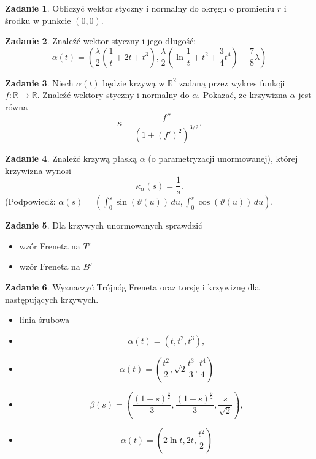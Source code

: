 \documentclass[a4paper,11pt]{article}
\theoremstyle{definition}\newtheorem{exercise}{Zadanie}
\theoremstyle{definition}\newtheorem{remark}{Uwaga}
\begin{document}
\begin{exercise}
Obliczyć wektor styczny i normalny do okręgu o promieniu $r$ i środku w 
punkcie $(0,0)$.
\end{exercise}

\begin{exercise}
Znaleźć wektor styczny i jego długość:
\[\alpha(t)=\left(\frac{\lambda}{2}\left(\frac{1}{t}+2t+t^3\right),\frac{\lambda
}{2}\left(\ln 
{\frac{1}{t}}+t^2+\frac{3}{4}t^4\right)-\frac{7}{8}\lambda\right)\]
\end{exercise}

\begin{exercise}
 Niech $\alpha(t)$ będzie krzywą w $\mathbb{R}^2$ zadaną przez wykres funkcji 
$f\colon 
\mathbb{R}\to \mathbb{R}$. Znaleźć wektory styczny i normalny do $\alpha$. 
Pokazać, że krzywizna $\alpha$ jest r\'owna
\[\kappa=\frac{\left|f''\right|}{\left(1+\left(f'\right)^2\right)^{3/2}}.\] 
\end{exercise}

\begin{exercise}
Znaleźć krzywą płaską $\alpha$ (o parametryzacji unormowanej), której krzywizna 
wynosi \[\kappa_\alpha(s)=\frac{1}{s}.\]
\footnotesize{(Podpowiedź: 
$\alpha(s)=\left(\int_0^s\sin(\vartheta(u))\,du,\int_0^s\cos(\vartheta(u))\,
du\right)$. }
\end{exercise}

\begin{exercise}
Dla krzywych unormowanych sprawdzić 
\begin{itemize}
 \item wz\'or Freneta na $T'$ 
 \item wz\'or Freneta na $B'$ 
\end{itemize}

\end{exercise}

\begin{exercise}
Wyznaczyć Tr\'ojn\'og Freneta oraz torsję i krzywiznę dla następujących 
krzywych.
\begin{itemize}
 \item linia śrubowa
\item 
\[\alpha(t)=\left(t,t^2,t^3\right),\]
\item 
\[\alpha(t)=\left(\frac{t^2}{2},\sqrt{2}\frac{t^3}{3},\frac{t^4}{4}\right)\]
\item 
\[\beta(s)=\left(\frac{(1+s)^{\frac{3}{2}}}{3},\frac{(1-s)^{\frac{3}
{ 2}}}{3},
\frac{s}{\sqrt{2}}\right),\]
\item \[\alpha(t)=\left(2\ln t,2t,\frac{t^2}{2}\right)\]

\end{itemize}

\end{exercise}
\end{document}
